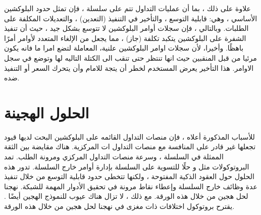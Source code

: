 \documentclass[12pt, a4paper, leqno]{report}
\theoremstyle{plain}
\theoremstyle{definition}
\begin{document}
\begin{multicols}{2}
\begin{otherlanguage}{arabic}
علاوة على ذلك ، بما أن عمليات التداول تتم على سلسلة ، فإن  تمثل حدود البلوكشين الأساسي ، وهي: قابلية التوسع ، والتأخير في التنفيذ (التعدين) ، والتعديلات المكلفة على الطلبات. وبالتالي ، فإن سجلات أوامر البلوكشين لا تتوسع بشكل جيد ، حيث أن تنفيذ الشفرة على البلوكشين يتكبد تكلفة (جاز) ، مما يجعل من الإلغاء المتعدد لأوامر  أمرًا باهظًا.
وأخيرا، لأن سجلات اوامر البلوكشين علنية، المعاملة لتضع امرا ما فانه يكون مرئيا من قبل المنقبين حيث انها تنتظر حتى تنقب الى الكتلة التاليه لها وتوضع في سجل الاوامر. هذا التأخير يعرض المستخدم لخطر أن يتجة للامام وأن يتحرك السعر أو التنفيذ ضده.
\end{otherlanguage}
\section{الحلول الهجينة}
\begin{otherlanguage}{arabic}
للأسباب المذكورة أعلاه ، فإن منصات التداول القائمه على البلوكشين البحت لديها قيود تجعلها غير قادر على المنافسة مع منصات التداول ات المركزية. هناك مقايضة بين الثقة الممثلة في السلسلة ، وسرعة منصات التداول  المركزي ومرونة الطلب. تمد البروتوكولات مثل و  حلًا للتسوية على السلسلة بإدارة أوامر خارج السلسلة. تدور هذه الحلول حول العقود الذكية المفتوحة ، ولكنها تتخطى حدود قابلية التوسع من خلال تنفيذ عدة وظائف خارج السلسلة وإعطاء نقاط مرونة في تحقيق الأدوار المهمة للشبكة. نهجنا لحل هجين من خلال هذه الورقة.
مع ذلك ، لا تزال هناك عيوب للنموذج الهجين أيضًا . يقترح بروتوكول  اختلافات ذات مغزى في نهجنا لحل هجين من خلال هذه الورقة.
\end{otherlanguage}
\end{multicols}

\end{document}
